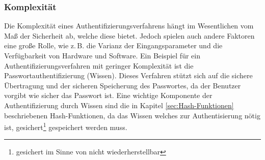 \documentclass[11pt,a4paper,ngerman]{scrreprt}
\begin{document}
\subsubsection{Komplexität}
Die Komplexität eines Authentifizierungsverfahrens hängt im Wesentlichen vom Maß der Sicherheit ab, welche diese bietet. Jedoch spielen auch andere Faktoren eine große Rolle, wie z.\,B. die Varianz der Eingangsparameter und die Verfügbarkeit von Hardware und Software. Ein Beispiel für ein Authentifizierungsverfahren mit geringer Komplexität ist die Passwortauthentifizierung (Wissen). Dieses Verfahren stützt sich auf die sichere Übertragung und der sicheren Speicherung des Passwortes, da der Benutzer vorgibt wie sicher das Passwort ist. Eine wichtige Komponente der Authentifizierung durch Wissen sind die in Kapitel \ref{sec:Hash-Funktionen} beschriebenen Hash-Funktionen, da das Wissen welches zur Authentisierung nötig ist, gesichert\footnote{gesichert im Sinne von nicht wiederherstellbar} gespeichert werden muss.
\end{document}
